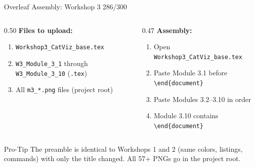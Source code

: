 \documentclass[10pt]{beamer}
\newcommand{\smark}[1]{\hfill{\scriptsize\color{codegray}#1}}
\begin{document}
\begin{frame}{Overleaf Assembly: Workshop 3}
\smark{286/300}
\begin{columns}[T]
\begin{column}{0.50\textwidth}
    \textbf{Files to upload:}
    \begin{enumerate}
        \item \texttt{Workshop3\_CatViz\_base.tex}
        \item \texttt{W3\_Module\_3\_1} through \texttt{W3\_Module\_3\_10} (\texttt{.tex})
        \item All \texttt{m3\_*.png} files (project root)
    \end{enumerate}
\end{column}
\begin{column}{0.47\textwidth}
    \textbf{Assembly:}
    \begin{enumerate}
        \item Open \texttt{Workshop3\_CatViz\_base.tex}
        \item Paste Module 3.1 before \texttt{\textbackslash end\{document\}}
        \item Paste Modules 3.2--3.10 in order
        \item Module 3.10 contains \texttt{\textbackslash end\{document\}}
    \end{enumerate}
\end{column}
\end{columns}

\vspace{0.3cm}
\begin{alertblock}{Pro-Tip}
    \scriptsize The preamble is identical to Workshops 1 and 2 (same colors, listings, commands) with only the title changed. All 57+ PNGs go in the project root.
\end{alertblock}
\end{frame}
\end{document}
